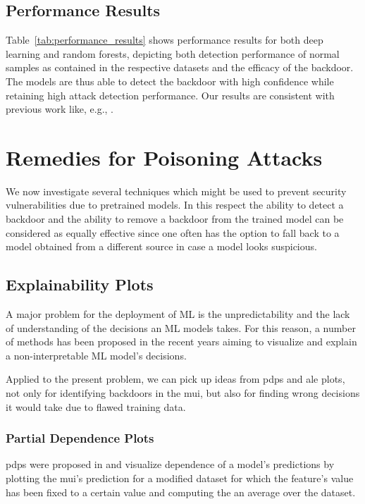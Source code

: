 \documentclass[10pt,sigconf,letterpaper,dvipsnames]{acmart}
\begin{document}
\subsection{Performance Results}
Table~\ref{tab:performance_results} shows performance results for both deep learning and random forests, depicting both detection performance of normal samples as contained in the respective datasets and the efficacy of the backdoor. The models are thus able to detect the backdoor with high confidence while retaining high attack detection performance.
Our results are consistent with previous work like, e.g., \cite{meghdouri_analysis_2018}.

\section{Remedies for Poisoning Attacks}
We now investigate several techniques which might be used to prevent security vulnerabilities due to pretrained models. In this respect the ability to detect a backdoor and the ability to remove a backdoor from the trained model can be considered as equally effective since one often has the option to fall back to a model obtained from a different source in case a model looks suspicious.

\subsection{Explainability Plots} \label{sec:plots}
A major problem for the deployment of ML is the unpredictability and the lack of understanding of the decisions an ML models takes. For this reason, a number of methods has been proposed in the recent years aiming to visualize and explain a non-interpretable ML model's decisions.

Applied to the present problem, we can pick up ideas from \glspl{pdp} and \gls{ale} plots, not only for identifying backdoors in the \gls{mui}, but also for finding wrong decisions it would take due to flawed training data.

\subsubsection{Partial Dependence Plots}
\glspl{pdp} were proposed in \cite{friedman_greedy_2001} and visualize dependence of a model's predictions by plotting the \gls{mui}'s prediction for a modified dataset for which the feature's value has been fixed to a certain value and computing the an average over the dataset.
\end{document}
